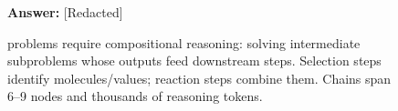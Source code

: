 \begin{figure}[t]
\begin{minipage}{0.50\textwidth}
\begin{tcolorbox}
        \vspace{0.2cm}
        \hfill \textbf{Answer:} [Redacted]
        \end{tcolorbox}
    \end{minipage}

    \caption{\textbf{\benchmark} problems require compositional reasoning: solving intermediate subproblems whose outputs feed downstream steps. \colorbox{teal!15}{Selection steps} identify molecules/values; \colorbox{teal!35}{reaction steps} combine them. Chains span 6--9 nodes and thousands of reasoning tokens.}
    \label{fig:sample-problems}
\end{figure}

